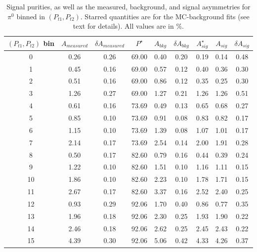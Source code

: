 \begin{table}[H]\footnotesize
\centering
\begin{tabular}{|c|c|c|c|c|c|c|c|c|}
\hline
$(P_{t1},P_{t2})$ bin & $A_{measured}$ & $\delta A_{measured}$ & $P^{\star}$ & $A_{bkg}$ & $\delta A_{bkg}$ & $A_{sig}^{\star}$ & $ A_{sig}$  & $\delta A_{sig}$ \\ \hline\hline
  0 & 0.26 & 0.26 & 69.00 & 0.40 & 0.20 & 0.19 & 0.14 & 0.48 \\ \hline  
  1 & 0.45 & 0.16 & 69.00 & 0.57 & 0.12 & 0.40 & 0.36 & 0.30 \\ \hline 
  2 & 0.51 & 0.16 & 69.00 & 0.86 & 0.12 & 0.35 & 0.25 & 0.30 \\ \hline 
  3 & 1.26 & 0.27 & 69.00 & 1.27 & 0.21 & 1.26 & 1.26 & 0.51 \\ \hline \hline
  4 & 0.61 & 0.16 & 73.69 & 0.49 & 0.13 & 0.65 & 0.68 & 0.27 \\ \hline 
  5 & 0.85 & 0.10 & 73.69 & 0.91 & 0.08 & 0.83 & 0.82 & 0.17 \\ \hline 
  6 & 1.15 & 0.10 & 73.69 & 1.39 & 0.08 & 1.07 & 1.01 & 0.17 \\ \hline 
  7 & 2.14 & 0.17 & 73.69 & 2.54 & 0.14 & 2.00 & 1.91 & 0.28 \\ \hline \hline
  8 & 0.50 & 0.17 & 82.60 & 0.79 & 0.16 & 0.44 & 0.39 & 0.24 \\ \hline 
  9 & 1.22 & 0.10 & 82.60 & 1.51 & 0.10 & 1.16 & 1.11 & 0.15 \\ \hline 
10 & 1.86 & 0.10 & 82.60 & 2.23 & 0.10 & 1.78 & 1.71 & 0.15 \\ \hline 
11 & 2.67 & 0.17 & 82.60 & 3.37 & 0.16 & 2.52 & 2.40 & 0.25 \\ \hline \hline
12 & 0.93 & 0.29 & 92.06 & 1.70 & 0.40 & 0.86 & 0.77 & 0.35 \\ \hline 
13 & 1.96 & 0.18 & 92.06 & 2.30 & 0.25 & 1.93 & 1.90 & 0.22 \\ \hline 
14 & 2.46 & 0.18 & 92.06 & 2.62 & 0.25 & 2.45 & 2.43 & 0.22 \\ \hline 
15 & 4.39 & 0.30 & 92.06 & 5.06 & 0.42 & 4.33 & 4.26 & 0.37 \\ \hline 
\end{tabular}
\caption[BG-correction quantities for $\pi^0$ asymmetries, $(P_{t1},P_{t2})$ bins]{Signal purities, as well as the measured, background, and signal asymmetries for $\pi^0$ binned in $(P_{t1},P_{t2})$. Starred quantities are for the MC-background fits (see text for details). All values are in \%.}
\label{tab:comptbkgcor}
\end{table}  

